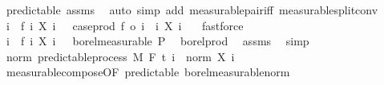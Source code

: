 \begin{isabellebody}
\ predictable\ assms{\isacharparenleft}{\kern0pt}{}{\isacharparenright}{\kern0pt}\ \isamarkupfalse%
\ {\isacharparenleft}{\kern0pt}auto\ simp\ add{\isacharcolon}{\kern0pt}\ measurable{\isacharunderscore}{\kern0pt}pair{\isacharunderscore}{\kern0pt}iff\ measurable{\isacharunderscore}{\kern0pt}split{\isacharunderscore}{\kern0pt}conv{\isacharparenright}{\kern0pt}\isanewline
\ \ \isamarkupfalse%
\ \isamarkupfalse%
\ {\isachardoublequoteopen}{\isacharparenleft}{\kern0pt}{\isasymlambda}{\isacharparenleft}{\kern0pt}i{\isacharcomma}{\kern0pt}\ {\isasymxi}{\isacharparenright}{\kern0pt}{\isachardot}{\kern0pt}\ f\ i\ {\isacharparenleft}{\kern0pt}X\ i\ {\isasymxi}{\isacharparenright}{\kern0pt}{\isacharparenright}{\kern0pt}\ {\isacharequal}{\kern0pt}\ case{\isacharunderscore}{\kern0pt}prod\ f\ o\ {\isacharparenleft}{\kern0pt}{\isasymlambda}{\isacharparenleft}{\kern0pt}i{\isacharcomma}{\kern0pt}\ {\isasymxi}{\isacharparenright}{\kern0pt}{\isachardot}{\kern0pt}\ {\isacharparenleft}{\kern0pt}i{\isacharcomma}{\kern0pt}\ X\ i\ {\isasymxi}{\isacharparenright}{\kern0pt}{\isacharparenright}{\kern0pt}{\isachardoublequoteclose}\ \isamarkupfalse%
\ fastforce\isanewline
\ \ \isamarkupfalse%
\ \isamarkupfalse%
\ {\isachardoublequoteopen}{\isacharparenleft}{\kern0pt}{\isasymlambda}{\isacharparenleft}{\kern0pt}i{\isacharcomma}{\kern0pt}\ {\isasymxi}{\isacharparenright}{\kern0pt}{\isachardot}{\kern0pt}\ f\ i\ {\isacharparenleft}{\kern0pt}X\ i\ {\isasymxi}{\isacharparenright}{\kern0pt}{\isacharparenright}{\kern0pt}\ {\isasymin}\ borel{\isacharunderscore}{\kern0pt}measurable\ {\isasymSigma}\isactrlsub P{\isachardoublequoteclose}\ \isamarkupfalse%
\ borel{\isacharunderscore}{\kern0pt}prod\ \isamarkupfalse%
\ assms\ \isamarkupfalse%
\ simp\isanewline
{}\isamarkupfalse%
%
\endisatagproof
{\isafoldproof}%
%
\isadelimproof
\isanewline
%
\endisadelimproof
\isanewline
{}\isamarkupfalse%
\ norm{\isacharcolon}{\kern0pt}\ {\isachardoublequoteopen}predictable{\isacharunderscore}{\kern0pt}process\ M\ F\ t\ {\isacharparenleft}{\kern0pt}{\isasymlambda}i\ {\isasymxi}{\isachardot}{\kern0pt}\ norm\ {\isacharparenleft}{\kern0pt}X\ i\ {\isasymxi}{\isacharparenright}{\kern0pt}{\isacharparenright}{\kern0pt}{\isachardoublequoteclose}%
\isadelimproof
\ %
\endisadelimproof
%
\isatagproof
{}\isamarkupfalse%
\ measurable{\isacharunderscore}{\kern0pt}compose{\isacharbrackleft}{\kern0pt}OF\ predictable\ borel{\isacharunderscore}{\kern0pt}measurable{\isacharunderscore}{\kern0pt}norm{\isacharbrackright}{\kern0pt}\ \isanewline

\end{isabellebody}
